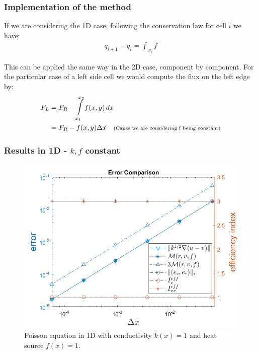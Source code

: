 \documentclass[t]{beamer}
\begin{document}
\begin{frame}
\frametitle{Implementation of the method}

If we are considering the 1D case, following the conservation law for cell $i$ we have:
\begin{align*}
q_{i+1} - q_i =  \int_{w_i} f
\end{align*}

This can be applied the same way in the 2D case, component by component. For the particular case of a left side cell we would compute the flux on the left edge by:
\begin{align*}
F_L &= F_R - \int\limits_{x_1}^{x_2} f(x,y) \,dx\ \\
&=  F_R - f(x,y)\Delta x \quad \text{\scriptsize{(Cause we are considering f being constant)}}
\end{align*}
\end{frame}

\begin{frame}
\frametitle{Results in 1D - $k,f$ constant}
\vspace{-18pt}
\begin{figure}[t]
\includegraphics[width = 0.7\linewidth]{convergenceplot_k_f_constant.png}
\caption{Poisson equation in 1D with conductivity $k(x) = 1$ and heat source $f(x) = 1$.}
\label{fig:Convergence1d1}
\end{figure}
\end{frame}
\end{document}
